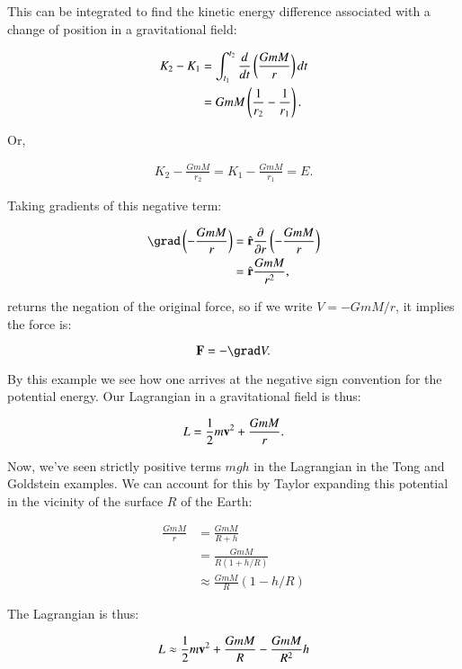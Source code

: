 \documentclass{article}      %
\begin{document}
This can be integrated to find the kinetic energy difference associated with a change of position in a gravitational field:

\begin{align*}
K_2 - K_1 
&= \int_{t_1}^{t_2} \frac{d}{dt} \left( \frac{GmM }{r} \right) dt \\
&= GmM \left( \frac{1}{r_2} - \frac{1}{r_1} \right).
\end{align*}

Or, 

\begin{align*}
K_2 - \frac{GmM}{r_2} = K_1 - \frac{GmM}{r_1} = E.
\end{align*}

Taking gradients of this negative term:

\begin{align*}
\grad \left( - \frac{GmM}{r} \right)
&= \rcap \frac{\partial}{\partial r} \left( - \frac{GmM}{r} \right) \\
&= \rcap \frac{GmM}{r^2},
\end{align*}

returns the negation of the original force, so if we write $V = -GmM/r$, it implies the force is:

\begin{equation}
\BF = -\grad V.
\end{equation}

By this example we see how one arrives at the negative sign convention for the potential energy.  Our 
Lagrangian in a gravitational field is thus:

\begin{equation}
L = \frac{1}{2} m \mathbf{v}^2 + \frac{GmM}{r}.
\end{equation}

Now, we've seen strictly positive terms $mgh$ in the Lagrangian in the Tong and Goldstein examples.  We can account for this by
Taylor expanding this potential in the vicinity of the surface $R$ of the Earth:

\begin{align*}
\frac{GmM}{r} 
&= \frac{GmM}{R + h} \\
&= \frac{GmM}{R(1 + h/R)} \\
&\approx \frac{GmM}{R} (1 - h/R)
\end{align*}

The Lagrangian is thus:

\begin{equation*}
L \approx \frac{1}{2} m \mathbf{v}^2 + \frac{GmM}{R} -\frac{GmM}{R^2} h
\end{equation*}
\end{document}
